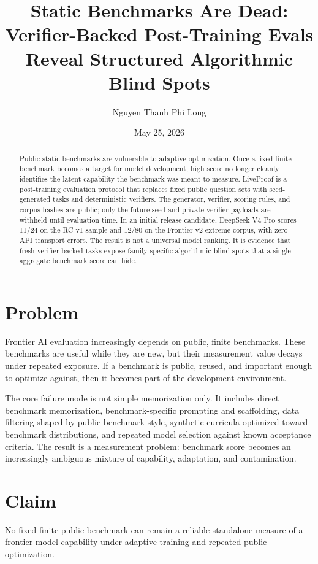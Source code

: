 \documentclass[11pt]{article}
\title{Static Benchmarks Are Dead:\\
Verifier-Backed Post-Training Evals Reveal Structured Algorithmic Blind Spots}
\author{Nguyen Thanh Phi Long}
\date{May 25, 2026}
\begin{document}
\maketitle

\begin{abstract}
Public static benchmarks are vulnerable to adaptive optimization. Once a fixed
finite benchmark becomes a target for model development, high score no longer
cleanly identifies the latent capability the benchmark was meant to measure.
LiveProof is a post-training evaluation protocol that replaces fixed public
question sets with seed-generated tasks and deterministic verifiers. The
generator, verifier, scoring rules, and corpus hashes are public; only the
future seed and private verifier payloads are withheld until evaluation time.
In an initial release candidate, DeepSeek V4 Pro scores 11/24 on the RC v1
sample and 12/80 on the Frontier v2 extreme corpus, with zero API transport
errors. The result is not a universal model ranking. It is evidence that fresh
verifier-backed tasks expose family-specific algorithmic blind spots that a
single aggregate benchmark score can hide.
\end{abstract}

\section{Problem}

Frontier AI evaluation increasingly depends on public, finite benchmarks. These
benchmarks are useful while they are new, but their measurement value decays
under repeated exposure. If a benchmark is public, reused, and important enough
to optimize against, then it becomes part of the development environment.

The core failure mode is not simple memorization only. It includes direct
benchmark memorization, benchmark-specific prompting and scaffolding, data
filtering shaped by public benchmark style, synthetic curricula optimized toward
benchmark distributions, and repeated model selection against known acceptance
criteria. The result is a measurement problem: benchmark score becomes an
increasingly ambiguous mixture of capability, adaptation, and contamination.

\section{Claim}

No fixed finite public benchmark can remain a reliable standalone measure of a
frontier model capability under adaptive training and repeated public
optimization.
\end{document}
